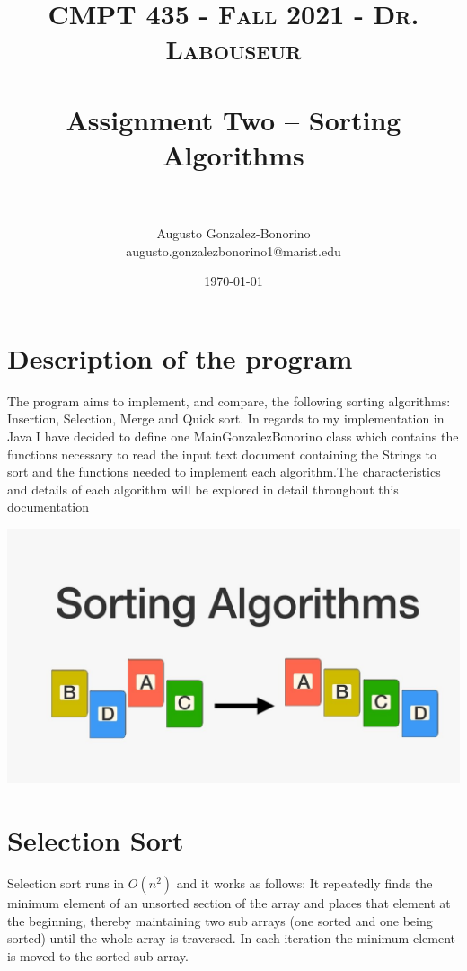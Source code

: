 \documentclass[letterpaper, 10pt]{article}
\title{	
   \normalfont \normalsize 
   \textsc{CMPT 435 - Fall 2021 - Dr. Labouseur} \\[10pt] %
   \horrule{0.5pt} \\[0.25cm] 	%
   \huge Assignment Two -- Sorting Algorithms \\     	    %
   \horrule{0.5pt} \\[0.25cm] 	%
}
\author{Augusto Gonzalez-Bonorino \\ \normalsize augusto.gonzalezbonorino1@marist.edu}
\date{\normalsize\today} 	%
\begin{document}
\maketitle %



\section{Description of the program}
The program aims to implement, and compare, the following sorting algorithms: Insertion, Selection, Merge and Quick sort. In regards to my implementation in Java I have decided to define one MainGonzalezBonorino class which contains the functions necessary to read the input text document containing the Strings to sort and the functions needed to implement each algorithm.The characteristics and details of each algorithm will be explored in detail throughout this documentation


\includegraphics[scale=0.25]{images/sorting_algorithms.jpg}

\pagebreak
\section{Selection Sort}

Selection sort runs in $O(n^2)$ and it works as follows: It repeatedly finds the minimum element of an unsorted section of the array and places that element at the beginning, thereby maintaining two sub arrays (one sorted and one being sorted) until the whole array is traversed. In each iteration the minimum element is moved to the sorted sub array. 
\end{document}
